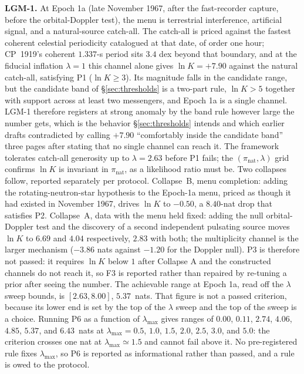 \documentclass[11pt]{article}
\newcommand{\lnK}{\ensuremath{\ln K}}
\begin{document}
\textbf{LGM-1.} At Epoch 1a (late November 1967, after the fast-recorder capture, before the orbital-Doppler test), the menu is terrestrial interference, artificial signal, and a natural-source catch-all. The catch-all is priced against the fastest coherent celestial periodicity catalogued at that date, of order one hour; CP~1919's coherent $1.337$-s period sits $3.4$ dex beyond that boundary, and at the fiducial inflation $\lambda = 1$ this channel alone gives $\lnK = +7.90$ against the natural catch-all, satisfying P1 ($\lnK \geq 3$). Its magnitude falls in the candidate range, but the candidate band of \S\ref{sec:thresholds} is a two-part rule, $\lnK > 5$ together with support across at least two messengers, and Epoch 1a is a single channel. LGM-1 therefore registers at strong anomaly by the band rule however large the number gets, which is the behavior \S\ref{sec:thresholds} intends and which earlier drafts contradicted by calling $+7.90$ ``comfortably inside the candidate band'' three pages after stating that no single channel can reach it. The framework tolerates catch-all generosity up to $\lambda = 2.63$ before P1 fails; the $(\pi_{\mathrm{nat}}, \lambda)$ grid confirms $\lnK$ is invariant in $\pi_{\mathrm{nat}}$, as a likelihood ratio must be. Two collapses follow, reported separately per protocol. Collapse~B, menu completion: adding the rotating-neutron-star hypothesis to the Epoch-1a menu, priced as though it had existed in November 1967, drives $\lnK$ to $-0.50$, a $8.40$-nat drop that satisfies P2. Collapse~A, data with the menu held fixed: adding the null orbital-Doppler test and the discovery of a second independent pulsating source moves $\lnK$ to $6.69$ and $4.04$ respectively, $2.83$ with both; the multiplicity channel is the larger mechanism ($-3.86$ nats against $-1.20$ for the Doppler null). P3 is therefore not passed: it requires $\lnK$ below $1$ after Collapse A and the constructed channels do not reach it, so F3 is reported rather than repaired by re-tuning a prior after seeing the number. The achievable range at Epoch 1a, read off the $\lambda$ sweep bounds, is $[2.63, 8.00]$, $5.37$~nats. That figure is not a passed criterion, because its lower end is set by the top of the $\lambda$ sweep and the top of the sweep is a choice. Running P6 as a function of $\lambda_{\max}$ gives ranges of $0.00$, $0.11$, $2.74$, $4.06$, $4.85$, $5.37$, and $6.43$~nats at $\lambda_{\max} = 0.5$, $1.0$, $1.5$, $2.0$, $2.5$, $3.0$, and $5.0$: the criterion crosses one nat at $\lambda_{\max} \simeq 1.5$ and cannot fail above it. No pre-registered rule fixes $\lambda_{\max}$, so P6 is reported as informational rather than passed, and a rule is owed to the protocol.
\end{document}
